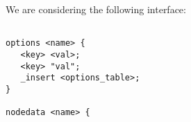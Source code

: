 \SSection{} 

We are considering the following interface:

\begin{verbatim}

options <name> {
   <key> <val>;
   <key> "val";
   _insert <options_table>;
}

nodedata <name> {
   





\end{verbatim}
